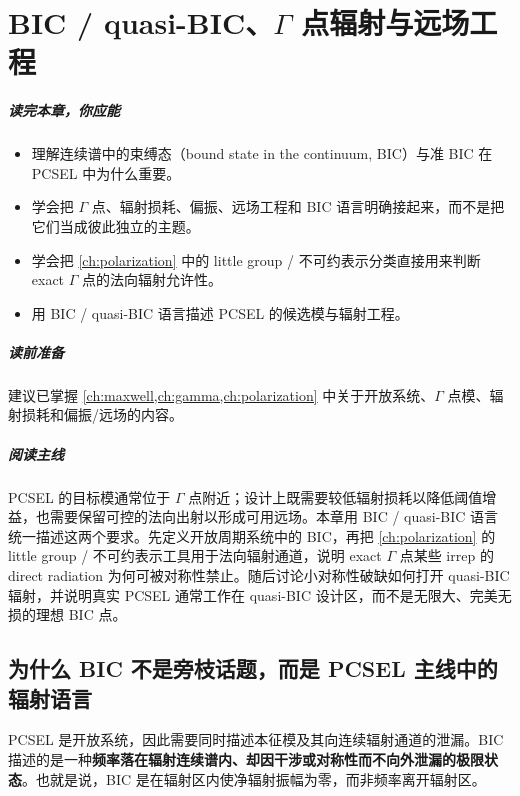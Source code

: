\chapter{BIC / quasi-BIC、\texorpdfstring{$\Gamma$}{Gamma} 点辐射与远场工程}
\label{ch:bic}

\paragraph{读完本章，你应能}
\begin{itemize}
  \item 理解连续谱中的束缚态（bound state in the continuum, BIC）与准 BIC 在 PCSEL 中为什么重要。
  \item 学会把 $\Gamma$ 点、辐射损耗、偏振、远场工程和 BIC 语言明确接起来，而不是把它们当成彼此独立的主题。
  \item 学会把 \cref{ch:polarization} 中的 little group / 不可约表示分类直接用来判断 exact $\Gamma$ 点的法向辐射允许性。
  \item 用 BIC / quasi-BIC 语言描述 PCSEL 的候选模与辐射工程。
\end{itemize}

\paragraph{读前准备}
建议已掌握 \cref{ch:maxwell,ch:gamma,ch:polarization} 中关于开放系统、$\Gamma$ 点模、辐射损耗和偏振/远场的内容。

\paragraph{阅读主线}
PCSEL 的目标模通常位于 $\Gamma$ 点附近；设计上既需要较低辐射损耗以降低阈值增益，也需要保留可控的法向出射以形成可用远场。本章用 BIC / quasi-BIC 语言统一描述这两个要求。先定义开放周期系统中的 BIC，再把 \cref{ch:polarization} 的 little group / 不可约表示工具用于法向辐射通道，说明 exact $\Gamma$ 点某些 irrep 的 direct radiation 为何可被对称性禁止。随后讨论小对称性破缺如何打开 quasi-BIC 辐射，并说明真实 PCSEL 通常工作在 quasi-BIC 设计区，而不是无限大、完美无损的理想 BIC 点。

\section{为什么 BIC 不是旁枝话题，而是 PCSEL 主线中的辐射语言}
PCSEL 是开放系统，因此需要同时描述本征模及其向连续辐射通道的泄漏。BIC 描述的是一种\textbf{频率落在辐射连续谱内、却因干涉或对称性而不向外泄漏的极限状态}。也就是说，BIC 是在辐射区内使净辐射振幅为零，而非频率离开辐射区。

